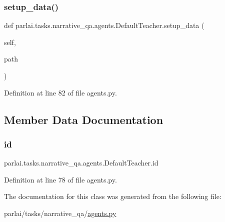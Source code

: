\subsubsection{\texorpdfstring{setup\+\_\+data()}{setup\_data()}}
{\footnotesize\ttfamily def parlai.\+tasks.\+narrative\+\_\+qa.\+agents.\+Default\+Teacher.\+setup\+\_\+data (\begin{DoxyParamCaption}\item[{}]{self,  }\item[{}]{path }\end{DoxyParamCaption})}



Definition at line 82 of file agents.\+py.



\subsection{Member Data Documentation}
\mbox{\label{classparlai_1_1tasks_1_1narrative__qa_1_1agents_1_1DefaultTeacher_a3eb0cdd21da621da606478fcf09b5e2e}} 
\subsubsection{\texorpdfstring{id}{id}}
{\footnotesize\ttfamily parlai.\+tasks.\+narrative\+\_\+qa.\+agents.\+Default\+Teacher.\+id}



Definition at line 78 of file agents.\+py.



The documentation for this class was generated from the following file\+:\begin{DoxyCompactItemize}
\item 
parlai/tasks/narrative\+\_\+qa/\hyperlink{parlai_2tasks_2narrative__qa_2agents_8py}{agents.\+py}\end{DoxyCompactItemize}
